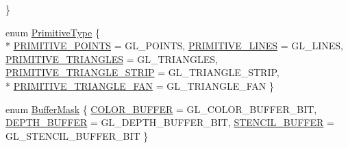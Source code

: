 \begin{DoxyCompactItemize}
 \}
\item 
enum \hyperlink{class_graphics_context_a240c1924416689e5700ff0d9f30539d9}{Primitive\+Type} \{ \\*
\hyperlink{class_graphics_context_a240c1924416689e5700ff0d9f30539d9ad65e06d0b867e575d79ed2ae09138227}{P\+R\+I\+M\+I\+T\+I\+V\+E\+\_\+\+P\+O\+I\+N\+T\+S} = G\+L\+\_\+\+P\+O\+I\+N\+T\+S, 
\hyperlink{class_graphics_context_a240c1924416689e5700ff0d9f30539d9afef78adda61f559edb2926d62e740e2b}{P\+R\+I\+M\+I\+T\+I\+V\+E\+\_\+\+L\+I\+N\+E\+S} = G\+L\+\_\+\+L\+I\+N\+E\+S, 
\hyperlink{class_graphics_context_a240c1924416689e5700ff0d9f30539d9a6c2db634fd752b5bf02a5cf37efae40e}{P\+R\+I\+M\+I\+T\+I\+V\+E\+\_\+\+T\+R\+I\+A\+N\+G\+L\+E\+S} = G\+L\+\_\+\+T\+R\+I\+A\+N\+G\+L\+E\+S, 
\hyperlink{class_graphics_context_a240c1924416689e5700ff0d9f30539d9af16b3d7162f95d2b54698205aadc4b04}{P\+R\+I\+M\+I\+T\+I\+V\+E\+\_\+\+T\+R\+I\+A\+N\+G\+L\+E\+\_\+\+S\+T\+R\+I\+P} = G\+L\+\_\+\+T\+R\+I\+A\+N\+G\+L\+E\+\_\+\+S\+T\+R\+I\+P, 
\\*
\hyperlink{class_graphics_context_a240c1924416689e5700ff0d9f30539d9a63e9e4fb756113df2d7c3148ae62357c}{P\+R\+I\+M\+I\+T\+I\+V\+E\+\_\+\+T\+R\+I\+A\+N\+G\+L\+E\+\_\+\+F\+A\+N} = G\+L\+\_\+\+T\+R\+I\+A\+N\+G\+L\+E\+\_\+\+F\+A\+N
 \}
\item 
enum \hyperlink{class_graphics_context_a2c5a9d1abe0cc51b3f0afcfa625431e7}{Buffer\+Mask} \{ \hyperlink{class_graphics_context_a2c5a9d1abe0cc51b3f0afcfa625431e7a1ffae172520a390eeb086b65dcbf1ee0}{C\+O\+L\+O\+R\+\_\+\+B\+U\+F\+F\+E\+R} = G\+L\+\_\+\+C\+O\+L\+O\+R\+\_\+\+B\+U\+F\+F\+E\+R\+\_\+\+B\+I\+T, 
\hyperlink{class_graphics_context_a2c5a9d1abe0cc51b3f0afcfa625431e7a9d07d2b828a5221842fde0c689d7bc34}{D\+E\+P\+T\+H\+\_\+\+B\+U\+F\+F\+E\+R} = G\+L\+\_\+\+D\+E\+P\+T\+H\+\_\+\+B\+U\+F\+F\+E\+R\+\_\+\+B\+I\+T, 
\hyperlink{class_graphics_context_a2c5a9d1abe0cc51b3f0afcfa625431e7a154ab4c2f59ab2425fa74958c235eb92}{S\+T\+E\+N\+C\+I\+L\+\_\+\+B\+U\+F\+F\+E\+R} = G\+L\+\_\+\+S\+T\+E\+N\+C\+I\+L\+\_\+\+B\+U\+F\+F\+E\+R\+\_\+\+B\+I\+T
 \}
\end{DoxyCompactItemize}
